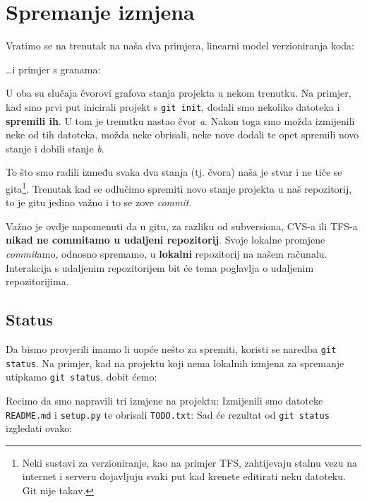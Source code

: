 \chapter*{Spremanje izmjena}

Vratimo se na trenutak na naša dva primjera, linearni model verzioniranja koda:



\dots{}i primjer s granama:



U oba su slučaja čvorovi grafova stanja projekta u nekom trenutku.
Na primjer, kad smo prvi put inicirali projekt s \verb+git init+, dodali smo nekoliko datoteka i \textbf{spremili ih}. 
U tom je trenutku nastao čvor \emph a.
Nakon toga smo možda izmijenili neke od tih datoteka, možda neke obrisali, neke nove dodali te opet spremili novo stanje i dobili stanje \emph b.

To što smo radili između svaka dva stanja (tj. čvora) naša je stvar i ne tiče se gita\footnote{Neki sustavi za verzioniranje, kao na primjer TFS, zahtijevaju stalnu vezu na internet i serveru dojavljuju svaki put kad krenete editirati neku datoteku. Git nije takav.}.
Trenutak kad se odlučimo spremiti novo stanje projekta u naš repozitorij, to je gitu jedino važno i to se zove \emph{commit}.

Važno je ovdje napomenuti da u gitu, za razliku od subversiona, CVS-a ili TFS-a \textbf{nikad ne commitamo u udaljeni repozitorij}. 
Svoje lokalne promjene \emph{commit}amo, odnosno spremamo, u \textbf{lokalni} repozitorij na našem računalu.
Interakcija s udaljenim repozitorijem bit će tema poglavlja o udaljenim repozitorijima.

\section*{Status}

Da bismo provjerili imamo li uopće nešto za spremiti, koristi se naredba \verb+git status+.
Na primjer, kad na projektu koji nema lokalnih izmjena za spremanje utipkamo \verb+git status+, dobit ćemo:



Recimo da smo napravili tri izmjene na projektu:
Izmijenili smo datoteke \verb+README.md+ i \verb+setup.py+ te obrisali \verb+TODO.txt+:
Sad će rezultat od \verb+git status+ izgledati ovako:

